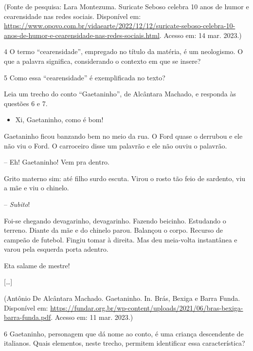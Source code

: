 (Fonte de pesquisa: Lara Montezuma. Suricate Seboso celebra 10 anos de
humor e cearensidade nas redes sociais. Disponível em: 
\url{https://www.opovo.com.br/vidaearte/2022/12/12/suricate-seboso-celebra-10-anos-de-humor-e-cearensidade-nas-redes-sociais.html}.
Acesso em: 14 mar. 2023.)

\num{4} O termo ``cearensidade'', empregado no título da matéria, é um
neologismo. O que a palavra significa, considerando o contexto em que se
insere?



\num{5} Como essa ``cearensidade'' é exemplificada no texto?



Leia um trecho do conto ``Gaetaninho'', de Alcântara Machado, e responda
às questões 6 e 7.

\begin{itemize}
\tightlist
\item
  Xi, Gaetaninho, como é bom!
\end{itemize}

Gaetaninho ficou banzando bem no meio da rua. O Ford quase o derrubou e
ele não viu o Ford. O carroceiro disse um palavrão e ele não ouviu o
palavrão.

-- Eh! Gaetaninho! Vem pra dentro.

Grito materno sim: até filho surdo escuta. Virou o rosto tão feio de
sardento, viu a mãe e viu o chinelo.

-- \emph{Subito}!

Foi-se chegando devagarinho, devagarinho. Fazendo beicinho. Estudando o
terreno. Diante da mãe e do chinelo parou. Balançou o corpo. Recurso de
campeão de futebol. Fingiu tomar à direita. Mas deu meia-volta
instantânea e varou pela esquerda porta adentro.

Eta salame de mestre!

{[}\ldots{}{]}

(Antônio De Alcântara Machado. Gaetaninho. In. Brás, Bexiga e Barra
Funda. Disponível em: 
\url{https://fundar.org.br/wp-content/uploads/2021/06/bras-bexiga-barra-funda.pdf}.
Acesso em: 11 mar. 2023.)

\num{6} Gaetaninho, personagem que dá nome ao conto, é uma criança
descendente de italianos. Quais elementos, neste trecho, permitem
identificar essa característica?

